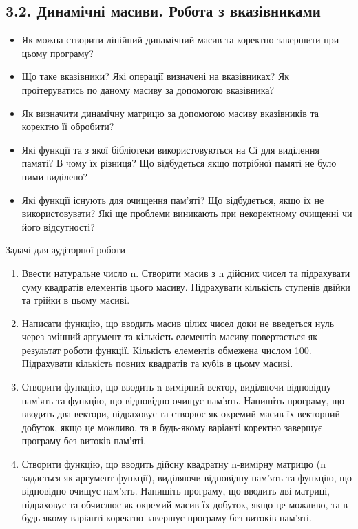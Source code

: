 \documentclass[]{article}
\date{}
\begin{document}
\newpage
\subsection{3.2. Динамічні масиви. Робота з вказівниками }
\setcounter{subsection}{1}


\begin{itemize}
\item
  Як можна створити лінійний динамічний масив та коректно завершити при
  цьому програму?
\item
  Що таке вказівники? Які операції визначені на вказівниках? Як
  проітеруватись по даному масиву за допомогою вказівника?
\item
  Як визначити динамічну матрицю за допомогою масиву вказівників та
  коректно її обробити?
\item
  Які функції та з якої бібліотеки використовуються на Сі для виділення
  памяті? В чому їх різниця? Що відбудеться якщо потрібної памяті не
  було ними виділено?
\item
  Які функції існують для очищення пам'яті? Що відбудеться, якщо їх не
  використовувати? Які ще проблеми виникають при некоректному очищенні
  чи його відсутності?
\end{itemize}

Задачі для аудіторної роботи

\begin{enumerate}
\def\labelenumi{\arabic{enumi})}
\item
  Ввести натуральне число n. Створити масив з n дійсних чисел та
  підрахувати суму квадратів елементів цього масиву. Підрахувати
  кількість ступенів двійки та трійки в цьому масиві.

\item
  Написати функцію, що вводить масив цілих чисел доки не введеться нуль
  через змінний аргумент та кількість елементів масиву повертається як
  результат роботи функції. Кількість елементів обмежена числом 100.
  Підрахувати кількість повних квадратів та кубів в цьому масиві.
\item
  Створити функцію, що вводить n-вимірний вектор, виділяючи відповідну
  пам'ять та функцію, що відповідно очищує пам'ять. Напишіть програму,
  що вводить два вектори, підраховує та створює як окремий масив їх
  векторний добуток, якщо це можливо, та в будь-якому варіанті коректно
  завершує програму без витоків пам'яті.
\item
  Створити функцію, що вводить дійсну квадратну n-вимірну матрицю (n
  задається як аргумент функції), виділяючи відповідну пам'ять та
  функцію, що відповідно очищує пам'ять. Напишіть програму, що вводить
  дві матриці, підраховує та обчислює як окремий масив їх добуток, якщо
  це можливо, та в будь-якому варіанті коректно завершує програму без
  витоків пам'яті.
\end{enumerate}
\end{document}
